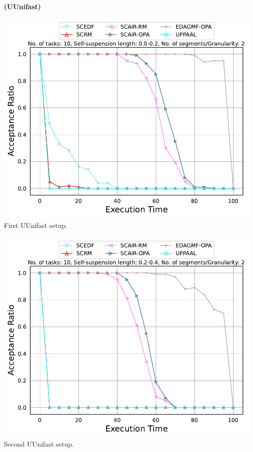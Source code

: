 \documentclass[]{article}
\begin{document}
	\begin{minipage}[t]{0.48\linewidth}
		\centering
		\textbf{(UUnifast)}
		\vspace{0.3cm}
		
		\includegraphics[width=\linewidth]{EFFSSTS_UUnifast_1st[2][0.0-0.2][10].pdf}
		First UUnifast setup.
		\vspace{0.3cm}
		
		\includegraphics[width=\linewidth]{EFFSSTS_UUnifast_2nd[2][0.2-0.4][10].pdf}
		Second UUnifast setup.
		\vspace{0.3cm}
		

		
	\end{minipage}\hfill
\end{document}
